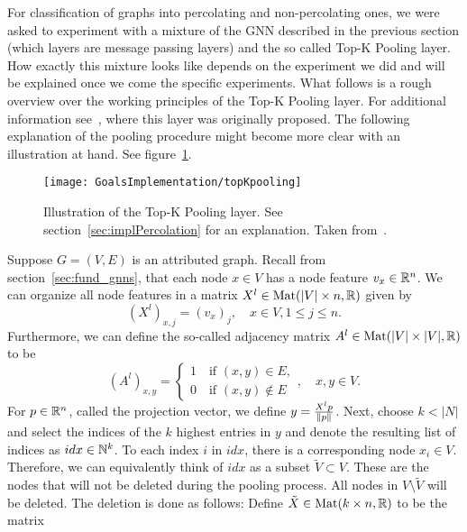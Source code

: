 \label{sec:implPercolation}
For classification of graphs into percolating and non-percolating ones, we were asked to experiment with a mixture of the GNN described in the previous section
(which layers are message passing layers) and the so called Top-K Pooling layer.
How exactly this mixture looks like depends on the experiment we did and will be explained once we come the specific experiments.
What follows is a rough overview over the working principles of the Top-K Pooling layer. 
For additional information see~\cite{topKPooling}, where this layer was originally proposed.
The following explanation of the pooling procedure might become more clear with
an illustration at hand. See figure~\ref{fig:topKPooling}.
\begin{figure}[h]
    \centering
    \texttt{[image: GoalsImplementation/topKpooling]}
    \caption{Illustration of the Top-K Pooling layer. See section~\ref{sec:implPercolation} for an explanation. Taken from~\cite{topKPooling}.}
    \label{fig:topKPooling}
\end{figure}
Suppose $G=(V,E)$ is an attributed graph. Recall from section~\ref{sec:fund_gnns}, 
that each node $x\in V$ has a node feature $v_x\in\mathbb{R}^n$. We can organize all node
features in a matrix $X^l\in\text{Mat}(|V|\times n,\mathbb{R})$ given by
\begin{equation}
    \left(X^l\right)_{x,j}=\left(v_x\right)_j, \quad x\in V, 1\leq j \leq n.
    \label{eq:matNodeFeatures}
\end{equation}
Furthermore, we can define the so-called adjacency matrix $A^l\in\text{Mat}(|V|\times |V|,\mathbb{R})$ to be
\begin{equation}
    \left(A^l\right)_{x,y}=\begin{cases}
        1 \quad \text{if } (x,y)\in E,\\
        0 \quad \text{if } (x,y)\notin E
    \end{cases}, \quad x,y\in V.
    \label{eq:matAdjacency}
\end{equation}
For $p\in\mathbb{R}^n$, called the projection vector, we define $y=\frac{X^l p}{\lVert p\rVert}$. 
Next, choose $k<|N|$ and select the indices of the $k$ highest entries in $y$ and denote the resulting 
list of indices as $idx\in\mathbb{N}^k$. To each index $i$ in $idx$, there is a corresponding 
node $x_i\in V$. Therefore, we can equivalently think of $idx$ as a subset $\tilde{V}\subset V$. 
These are the nodes that will not be deleted during the pooling process. 
All nodes in $V\setminus\tilde{V}$ will be deleted. 
The deletion is done as follows: Define $\tilde{X}\in\text{Mat}(k\times n,\mathbb{R})$ to be the matrix
